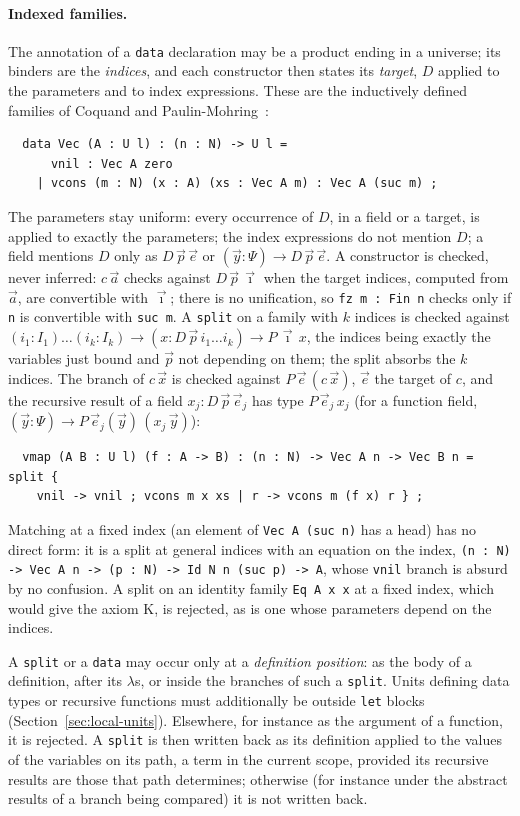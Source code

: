 \documentclass[11pt]{article}
\newcommand{\kw}[1]{\texttt{#1}}
\theoremstyle{remark}
\begin{document}
\paragraph{Indexed families.} The annotation of a \kw{data} declaration
may be a product ending in a universe; its binders are the
\emph{indices}, and each constructor then states its \emph{target},
$D$ applied to the parameters and to index expressions. These are the
inductively defined families of Coquand and
Paulin-Mohring~\cite{CPM}:
\begin{verbatim}
  data Vec (A : U l) : (n : N) -> U l =
      vnil : Vec A zero
    | vcons (m : N) (x : A) (xs : Vec A m) : Vec A (suc m) ;
\end{verbatim}
The parameters stay uniform: every occurrence of $D$, in a field or a
target, is applied to exactly the parameters; the index expressions do
not mention $D$; a field mentions $D$ only as $D\,\vec p\,\vec e$ or
$(\vec y:\Psi)\to D\,\vec p\,\vec e$. A constructor is checked, never
inferred: $c\,\vec a$ checks against $D\,\vec p\,\vec\imath$ when the
target indices, computed from $\vec a$, are convertible with
$\vec\imath$; there is no unification, so \kw{fz m : Fin n} checks only
if \kw{n} is convertible with \kw{suc m}. A \kw{split} on a family with
$k$ indices is checked against
$(i_1:I_1)\dots(i_k:I_k)\to(x:D\,\vec p\,i_1\dots i_k)\to P\,\vec\imath\,x$,
the indices being exactly the variables just bound and $\vec p$ not
depending on them; the split absorbs the $k$ indices. The branch of
$c\,\vec x$ is checked against $P\,\vec e\,(c\,\vec x)$, $\vec e$ the
target of $c$, and the recursive result of a field
$x_j : D\,\vec p\,\vec e_j$ has type $P\,\vec e_j\,x_j$ (for a function
field, $(\vec y:\Psi)\to P\,\vec e_j(\vec y)\,(x_j\,\vec y)$):
\begin{verbatim}
  vmap (A B : U l) (f : A -> B) : (n : N) -> Vec A n -> Vec B n = split {
    vnil -> vnil ; vcons m x xs | r -> vcons m (f x) r } ;
\end{verbatim}
Matching at a fixed index (an element of \kw{Vec A (suc n)} has a head)
has no direct form: it is a split at general indices with an equation on
the index, \kw{(n : N) -> Vec A n -> (p : N) -> Id N n (suc p) -> A},
whose \kw{vnil} branch is absurd by no confusion. A split on an
identity family \kw{Eq A x x} at a fixed index, which would give the
axiom K, is rejected, as is one whose parameters depend on the indices.

A \kw{split} or a \kw{data} may occur only at a \emph{definition
position}: as the body of a definition, after its $\lambda$s, or inside
the branches of such a \kw{split}. Units defining data types or recursive
functions must additionally be outside \kw{let} blocks
(Section~\ref{sec:local-units}). Elsewhere, for instance as the
argument of a function, it is rejected. A \kw{split} is then written
back as its definition applied to the values of the variables on its
path, a term in the current scope, provided its recursive results are
those that path determines; otherwise (for instance under the abstract
results of a branch being compared) it is not written back.
\end{document}
